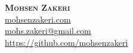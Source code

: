 \documentclass[A4,11pt]{article}
\begin{document}
\begin{comment}
In Europe it is common to include a picture of ones self in the CV. Select
which heading appropriate for the document you are creating.

\begin{minipage}[c]{0.05\textwidth}
\-\
\end{minipage}
\begin{minipage}[c]{0.2\textwidth}
\begin{tikzpicture}
\end{tikzpicture}
\end{minipage}

\end{comment}

\begin{minipage}[c]{0.4\textwidth}
    \textbf{\Huge \scshape{Mohsen Zakeri}} \\ 
    \href{https://www.mohsenzakeri.com}{mohsenzakeri.com} \\
    \href{mailto:mohs.zakeri@gmail.com}{mohs.zakeri@gmail.com} \\
    \href{https://github.com/mohsenzakeri}{https://github.com/mohsenzakeri}
\end{minipage}

\end{document}
